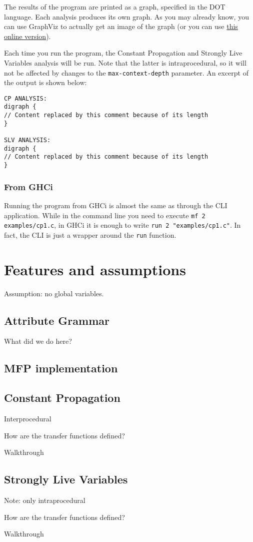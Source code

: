 \documentclass{article}
\begin{document}
The results of the program are printed as a graph, specified in the DOT language. Each analysis produces its own graph. As you may already know, you can use GraphViz to actually get an image of the graph (or you can use \href{http://www.webgraphviz.com/}{this online version}).

Each time you run the program, the Constant Propagation and Strongly Live Variables analysis will be run. Note that the latter is intraprocedural, so it will not be affected by changes to the \texttt{max-context-depth} parameter. An excerpt of the output is shown below:

\begin{verbatim}
CP ANALYSIS:
digraph {
// Content replaced by this comment because of its length
}

SLV ANALYSIS:
digraph {
// Content replaced by this comment because of its length
}
\end{verbatim}

\subsubsection*{From GHCi}

Running the program from GHCi is almost the same as through the CLI application. While in the command line you need to execute \texttt{mf 2 examples/cp1.c}, in GHCi it is enough to write \texttt{run 2 "examples/cp1.c"}. In fact, the CLI is just a wrapper around the \texttt{run} function.

\section*{Features and assumptions}

Assumption: no global variables.

\subsection*{Attribute Grammar}

What did we do here?

\subsection*{MFP implementation}

\subsection*{Constant Propagation}

Interprocedural

How are the transfer functions defined?

Walkthrough

\subsection*{Strongly Live Variables}

Note: only intraprocedural

How are the transfer functions defined?

Walkthrough
\end{document}
